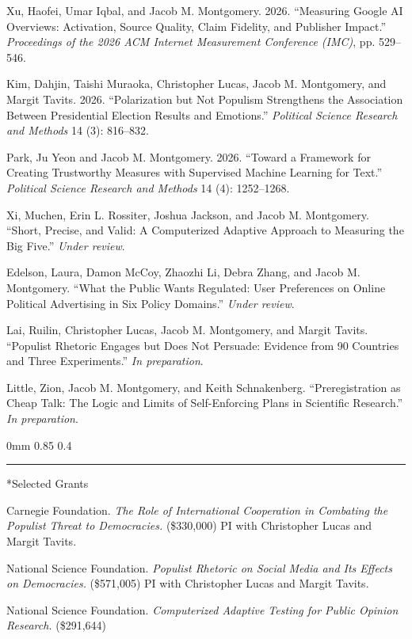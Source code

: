 \documentclass[10pt]{article}
\makeatletter
\renewcommand{\section}{\@startsection{section}{12}
{0mm}
{0.85\baselineskip}
{0.4\baselineskip}
{\large\bfseries\scshape\hrule\vspace{0.45\baselineskip}}}
\renewenvironment{CV}
  {\begin{list}{}
    {\renewcommand{\makelabel}{\entrylabel}
    \setlength{\labelwidth}{55pt}
    \setlength{\leftmargin}{62pt}
    \setlength{\itemsep}{2pt}
    \setlength{\parsep}{0pt}
  }}
  {\end{list}}
\newenvironment{CVpub}
  {\begin{list}{}
    {\setlength{\labelwidth}{0pt}
    \setlength{\leftmargin}{14pt}
    \setlength{\itemindent}{-14pt}
    \setlength{\itemsep}{2pt}
    \setlength{\parsep}{0pt}
  }}
  {\end{list}}
\makeatother
\begin{document}
\begin{CVpub}

\item[] Xu, Haofei, Umar Iqbal, and Jacob M. Montgomery. 2026. ``Measuring Google AI Overviews: Activation, Source Quality, Claim Fidelity, and Publisher Impact.'' \textit{Proceedings of the 2026 ACM Internet Measurement Conference (IMC)}, pp. 529--546.

\item[] Kim, Dahjin, Taishi Muraoka, Christopher Lucas, Jacob M. Montgomery, and Margit Tavits. 2026. ``Polarization but Not Populism Strengthens the Association Between Presidential Election Results and Emotions.'' \textit{Political Science Research and Methods} 14 (3): 816--832.

\item[] Park, Ju Yeon and Jacob M. Montgomery. 2026. ``Toward a Framework for Creating Trustworthy Measures with Supervised Machine Learning for Text.'' \textit{Political Science Research and Methods} 14 (4): 1252--1268.

\item[] Xi, Muchen, Erin L. Rossiter, Joshua Jackson, and Jacob M. Montgomery. ``Short, Precise, and Valid: A Computerized Adaptive Approach to Measuring the Big Five.'' \textit{Under review}.

\item[] Edelson, Laura, Damon McCoy, Zhaozhi Li, Debra Zhang, and Jacob M. Montgomery. ``What the Public Wants Regulated: User Preferences on Online Political Advertising in Six Policy Domains.'' \textit{Under review}.

\item[] Lai, Ruilin, Christopher Lucas, Jacob M. Montgomery, and Margit Tavits. ``Populist Rhetoric Engages but Does Not Persuade: Evidence from 90 Countries and Three Experiments.'' \textit{In preparation}.

\item[] Little, Zion, Jacob M. Montgomery, and Keith Schnakenberg. ``Preregistration as Cheap Talk: The Logic and Limits of Self-Enforcing Plans in Scientific Research.'' \textit{In preparation}.

\end{CVpub}


\section*{Selected Grants}

\begin{CV}
\item[2023] Carnegie Foundation. \textit{The Role of International Cooperation in Combating the Populist Threat to Democracies.} (\$330,000) PI with Christopher Lucas and Margit Tavits.
\item[2022] National Science Foundation. \textit{Populist Rhetoric on Social Media and Its Effects on Democracies.} (\$571,005) PI with Christopher Lucas and Margit Tavits.
\item[2016] National Science Foundation. \textit{Computerized Adaptive Testing for Public Opinion Research.} (\$291,644)
\end{CV}
\end{document}
